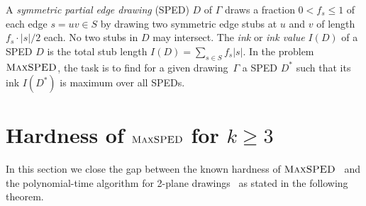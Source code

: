 \documentclass[a4paper, USenglish]{llncs}
\newcommand{\maxsped}{\ensuremath{\textsc{MaxSPED}}\xspace}
\begin{document}
	A \emph{symmetric partial edge drawing} (SPED) $D$ of $\Gamma$ draws a fraction $0 < f_s \le 1$ of each edge $s = uv \in S$ by drawing two symmetric edge stubs at $u$ and $v$ of length $f_s \cdot |s|/2$ each. 
	No two stubs in $D$ may intersect.
	The \emph{ink} or \emph{ink value}  $I(D)$ of a SPED $D$ is the total stub length $I(D) = \sum_{s \in S} f_s |s|$.
	In the problem \maxsped, the task is to find for a given drawing~$\Gamma$ a SPED $D^*$ such that its ink $I(D^*)$ is maximum over all SPEDs.
	
	\section{Hardness of \maxsped for $k\ge3$}\label{sec:hardness}
	
	In this section we close the gap between the known hardness of \maxsped~\cite{b-sgh-15} and the polynomial-time algorithm for 2-plane drawings~\cite{bcgkmn-pped-17} as stated in the following theorem.
	
\end{document}
